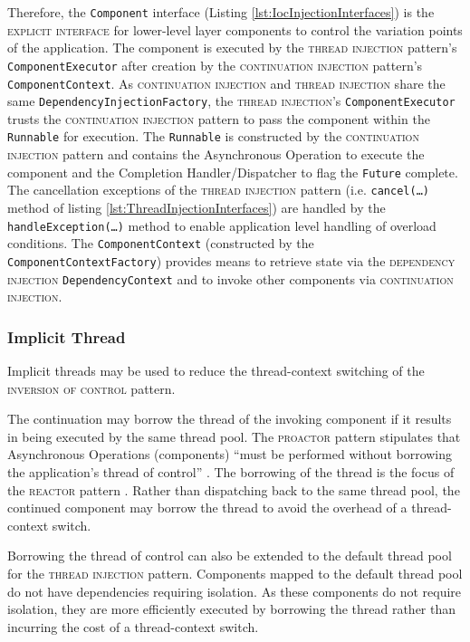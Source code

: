 \documentclass[prodmode]{style/acmlarge}
\begin{document}
Therefore, the \texttt{Component} interface (Listing
\ref{lst:IocInjectionInterfaces}) is the \textsc{explicit interface} for
lower-level layer components to control the variation points of the application.
 The component is executed by the \textsc{thread injection} pattern's
\texttt{ComponentExecutor} after creation by the \textsc{continuation injection}
pattern's \texttt{ComponentContext}.  As \textsc{continuation injection} and
\textsc{thread injection} share the same \texttt{DependencyInjectionFactory},
the \textsc{thread injection}'s \texttt{ComponentExecutor} trusts the
\textsc{continuation injection} pattern to pass the component within the
\texttt{Runnable} for execution.  The \texttt{Runnable} is constructed by the
\textsc{continuation injection} pattern and contains the Asynchronous Operation
to execute the component and the Completion Handler/Dispatcher to flag the
\texttt{Future} complete.  The cancellation exceptions of the \textsc{thread
injection} pattern (i.e. \texttt{cancel(\ldots)} method of listing
\ref{lst:ThreadInjectionInterfaces}) are handled by the
\texttt{handleException(\ldots)} method to enable application level handling of
overload conditions.  The \texttt{ComponentContext} (constructed by the
\texttt{ComponentContextFactory}) provides means to retrieve state via the
\textsc{dependency injection} \texttt{Dependency\-Context} and to invoke other
components via \textsc{continuation injection}.


\subsubsection*{Implicit Thread}

Implicit threads may be used to reduce the thread-context switching of the
\textsc{inversion of control} pattern.

The continuation may borrow the thread of the invoking component if it results
in being executed by the same thread pool.  The \textsc{proactor} pattern
stipulates that Asynchronous Operations (components) ``must be performed without
borrowing the application's thread of control'' \cite[p. 8]{proactor}.  The
borrowing of the thread is the focus of the \textsc{reactor} pattern
\cite{reactor}.  Rather than dispatching back to the same thread pool, the
continued component may borrow the thread to avoid the overhead of a
thread-context switch.

Borrowing the thread of control can also be extended to the default thread pool
for the \textsc{thread injection} pattern.  Components mapped to the default
thread pool do not have dependencies requiring isolation.  As these components
do not require isolation, they are more efficiently executed by borrowing the
thread rather than incurring the cost of a thread-context switch.
\end{document}
